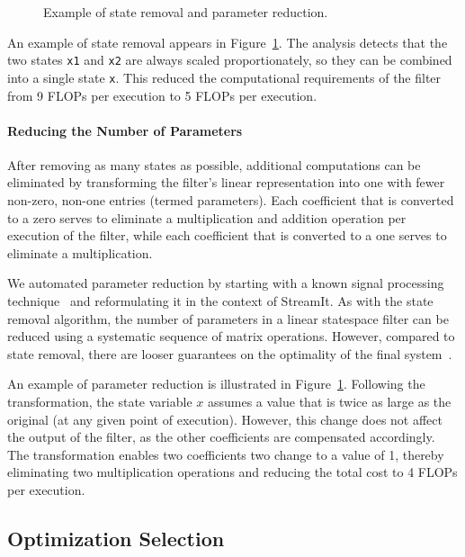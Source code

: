 \begin{figure}[t]
\centering
{}
\caption{Example of state removal and parameter reduction.\protect\label{fig:states}}
\end{figure}

An example of state removal appears in Figure~\ref{fig:states}.  The
analysis detects that the two states {\tt x1} and {\tt x2} are always
scaled proportionately, so they can be combined into a single state
{\tt x}.  This reduced the computational requirements of the filter
from 9 FLOPs per execution to 5 FLOPs per execution.

\paragraph*{Reducing the Number of Parameters}  After removing as 
many states as possible, additional computations can be eliminated by
transforming the filter's linear representation into one with fewer
non-zero, non-one entries (termed parameters).  Each coefficient that
is converted to a zero serves to eliminate a multiplication and
addition operation per execution of the filter, while each coefficient
that is converted to a one serves to eliminate a multiplication.  

We automated parameter reduction by starting with a known signal
processing technique~\cite{Ackermann/Bucy} and reformulating it in the
context of StreamIt.  As with the state removal algorithm, the number
of parameters in a linear statespace filter can be reduced using a
systematic sequence of matrix operations.  However, compared to state
removal, there are looser guarantees on the optimality of the final
system~\cite{agrawal-cases05}.

An example of parameter reduction is illustrated in
Figure~\ref{fig:states}.  Following the transformation, the state
variable $x$ assumes a value that is twice as large as the original
(at any given point of execution).  However, this change does not
affect the output of the filter, as the other coefficients are
compensated accordingly.  The transformation enables two coefficients
two change to a value of 1, thereby eliminating two multiplication
operations and reducing the total cost to 4 FLOPs per execution.

\subsection*{Optimization Selection}

